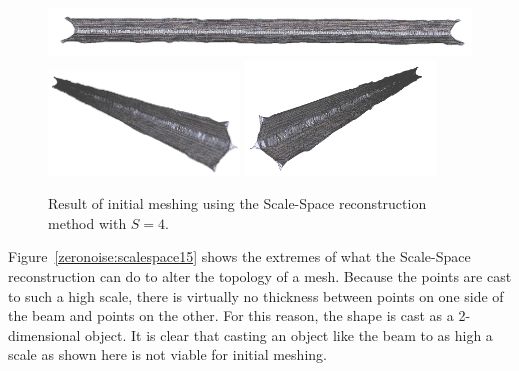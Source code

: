 \documentclass[12pt]{drexelthesis}
\begin{document}
\begin{figure}[!ht]
	\centering
		\includegraphics[width=5in]{simulated-lab-scan/0noise/cleanNeat/scalespace400.png}
		\includegraphics[width=2in]{simulated-lab-scan/0noise/cleanNeat/scalespace401.png}
		\includegraphics[width=2in]{simulated-lab-scan/0noise/cleanNeat/scalespace402.png}
		\caption[Initial meshing using a Scale-Space reconstruction with $S = 4$]{\centering  Result of initial meshing using the Scale-Space reconstruction method with $S = 4$.}
		\label{zeronoise:scalespace4}
\end{figure}

Figure~\ref{zeronoise:scalespace15} shows the extremes of what the Scale-Space reconstruction can do to alter the topology of a mesh. Because the points are cast to such a high scale, there is virtually no thickness between points on one side of the beam and points on the other. For this reason, the shape is cast as a 2-dimensional object. It is clear that casting an object like the beam to as high a scale as shown here is not viable for initial meshing. 
\end{document}

